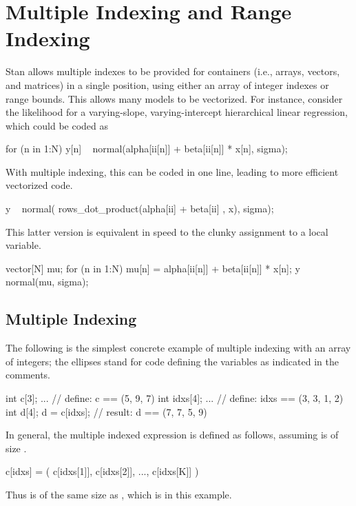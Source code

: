 \chapter{Multiple Indexing and Range Indexing}\label{multi-indexing.chapter}

\noindent
Stan allows multiple indexes to be provided for containers (i.e.,
arrays, vectors, and matrices) in a single position, using either an
array of integer indexes or range bounds.  This allows many models to
be vectorized.  For instance, consider the likelihood for a varying-slope,
varying-intercept hierarchical linear regression, which could be coded
as
%
\begin{stancode}
for (n in 1:N)
  y[n] ~ normal(alpha[ii[n]] + beta[ii[n]] * x[n], sigma);
\end{stancode}
%
With multiple indexing, this can be coded in one line, leading to more
efficient vectorized code.
%
\begin{stancode}
y ~ normal( rows_dot_product(alpha[ii] + beta[ii] , x), sigma);
\end{stancode}
%
This latter version is equivalent in speed to the clunky assignment to
a local variable.
%
\begin{stancode}
{ 
  vector[N] mu;
  for (n in 1:N)
    mu[n] = alpha[ii[n]] + beta[ii[n]] * x[n];
  y ~ normal(mu, sigma);
}
\end{stancode}

\section{Multiple Indexing}

The following is the simplest concrete example of multiple indexing
with an array of integers;  the ellipses stand for code defining the
variables as indicated in the comments.
%
\begin{stancode}
int c[3];     
...             // define: c == (5, 9, 7)
int idxs[4];   
...             // define: idxs == (3, 3, 1, 2)
int d[4];
d = c[idxs];   // result: d == (7, 7, 5, 9)
\end{stancode}
%

In general, the multiple indexed expression  is defined
as follows, assuming  is of size .
%
\begin{stancode}
c[idxs] = ( c[idxs[1]], c[idxs[2]], ..., c[idxs[K]] )
\end{stancode}
%
Thus  is of the same size as , which is
 in this example.

